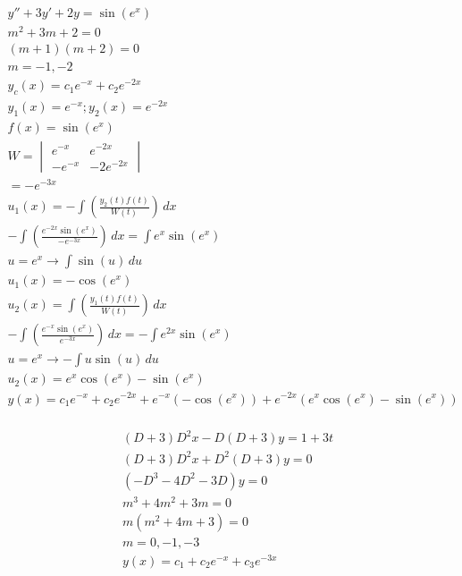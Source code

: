 \documentclass[12pt]{article}
\begin{document}
\begin{equation}
  \begin{split}
    y''+3y'+2y=\sin(e^x)\\
    m^2+3m+2=0\\
    (m+1)(m+2)=0\\
    m=-1,-2\\
    y_c(x)=c_1e^{-x}+c_2e^{-2x}\\
    y_1(x)=e^{-x}; y_2(x)=e^{-2x}\\
    f(x)=\sin(e^x)\\
    W=\begin{vmatrix} e^{-x} & e^{-2x} \\ -e^{-x} & -2e^{-2x} \end{vmatrix}\\
    =-e^{-3x}\\
    u_1(x)=-\int \left( \frac{y_2(t)f(t)}{W(t)} \right)\,dx\\
    -\int\left( \frac{e^{-2x}\sin(e^x)}{-e^{-3x}} \right)\,dx=\int e^x\sin(e^x)\\
    u=e^x\rightarrow\int \sin(u)\,du\\
    u_1(x)=-\cos(e^x)\\
    u_2(x)=\int \left( \frac{y_1(t)f(t)}{W(t)} \right)\,dx\\
    -\int\left( \frac{e^{-x}\sin(e^x)}{e^{-3x}} \right)\,dx=-\int e^{2x}\sin(e^x)\\
    u=e^x\rightarrow-\int u\sin(u)\,du\\
    u_2(x)=e^x\cos(e^x)-\sin(e^x)\\
    y(x)=c_1e^{-x}+c_2e^{-2x}+e^{-x}(-\cos(e^x))+e^{-2x}(e^x\cos(e^x)-\sin(e^x))\\
  \end{split}
  \label{6}
\end{equation}
\hline


\begin{equation}
  \begin{split}
    (D+3)D^2x-D(D+3)y=1+3t\\
    (D+3)D^2x+D^2(D+3)y=0\\
  (-D^3-4D^2-3D)y=0\\
  m^3+4m^2+3m=0\\
  m(m^2+4m+3)=0\\
  m=0,-1,-3\\
  y(x)=c_1+c_2e^{-x}+c_3e^{-3x}\\
  \end{split}
  \label{7}
\end{equation}
\hline
\end{document}
